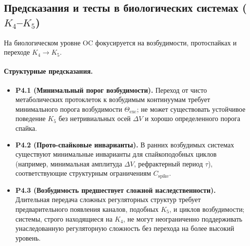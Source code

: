 \subsection{Предсказания и тесты в биологических системах
            (\texorpdfstring{$K_4$}{K\_4}--\texorpdfstring{$K_5$}{K\_5})}

На биологическом уровне OC фокусируется на возбудимости, протоспайках и
переходе \(K_4 \to K_5\).

\paragraph{Структурные предсказания.}
\begin{itemize}
  \item \textbf{P4.1 (Минимальный порог возбудимости).}
        Переход от чисто метаболических протоклеток к возбудимым континуумам
        требует минимального порога возбудимости
        \(\Theta_{\mathrm{exc}}\); не может существовать устойчивое
        поведение \(K_5\) без нетривиальных осей \(\Delta V\) и хорошо
        определенного порога спайка.
  \item \textbf{P4.2 (Прото-спайковые инварианты).}
        В ранних возбудимых системах существуют минимальные инварианты для
        спайкоподобных циклов (например, минимальная амплитуда
        \(\Delta V\), рефрактерный период \(\tau\)), соответствующие
        структурным ограничениям \(C_{\mathrm{spike}}\).
  \item \textbf{P4.3 (Возбудимость предшествует сложной наследственности).}
        Длительная передача сложных регуляторных структур требует предварительного
        появления каналов, подобных \(K_5\), и циклов возбудимости;
        системы, строго находящиеся на \(K_4\), не могут неограниченно
        поддерживать унаследованную регуляторную сложность без перехода на
        более высокий уровень.
\end{itemize}

